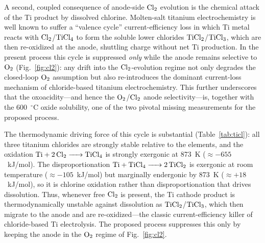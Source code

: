 \documentclass[pdflatex,sn-basic,Numbered]{sn-jnl}
\begin{document}
A second, coupled consequence of anode-side $\ce{Cl2}$ evolution is the chemical attack of the Ti product by dissolved chlorine. Molten-salt titanium electrochemistry is well known to suffer a ``valence cycle'' current-efficiency loss in which Ti metal reacts with $\ce{Cl2}$/$\ce{TiCl4}$ to form the soluble lower chlorides $\ce{TiCl2}$/$\ce{TiCl3}$, which are then re-oxidized at the anode, shuttling charge without net Ti production. In the present process this cycle is suppressed \emph{only} while the anode remains selective to $\ce{O2}$ (Fig.~\ref{fig:cl2}): any drift into the $\ce{Cl2}$-evolution regime not only degrades the closed-loop $\ce{O2}$ assumption but also re-introduces the dominant current-loss mechanism of chloride-based titanium electrochemistry. This further underscores that the oxoacidity---and hence the $\ce{O2}$/$\ce{Cl2}$ anode selectivity---is, together with the 600~$^{\circ}$C oxide solubility, one of the two pivotal missing measurements for the proposed process.

The thermodynamic driving force of this cycle is substantial (Table~\ref{tab:ticl}): all three titanium chlorides are strongly stable relative to the elements, and the oxidation $\ce{Ti + 2Cl2 -> TiCl4}$ is strongly exergonic at 873~K ($\approx -655$~kJ/mol). The disproportionation $\ce{Ti + TiCl4 -> 2TiCl2}$ is exergonic at room temperature ($\approx -105$~kJ/mol) but marginally endergonic by 873~K ($\approx +18$~kJ/mol), so it is chlorine oxidation rather than disproportionation that drives dissolution. Thus, whenever free $\ce{Cl2}$ is present, the Ti cathode product is thermodynamically unstable against dissolution as $\ce{TiCl2}$/$\ce{TiCl3}$, which then migrate to the anode and are re-oxidized---the classic current-efficiency killer of chloride-based Ti electrolysis. The proposed process suppresses this only by keeping the anode in the $\ce{O2}$ regime of Fig.~\ref{fig:cl2}.
\end{document}
